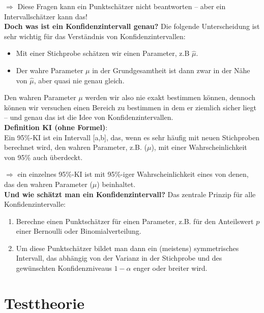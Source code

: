 \documentclass[a4paper]{article}
\begin{document}
\noindent $\Rightarrow$ Diese Fragen kann ein Punktschätzer nicht beantworten – aber ein Intervallschätzer kann das!\\

\noindent \textbf{Doch was ist ein Konfidenzintervall genau?} Die folgende Unterscheidung ist sehr wichtig für das Verständnis von Konfidenzintervallen:

\begin{itemize}
    \item Mit einer Stichprobe schätzen wir einen Parameter, z.B $\hat{\mu}$.
    \item Der wahre Parameter $\mu$ in der Grundgesamtheit ist dann zwar in der Nähe von $\hat{\mu}$, aber quasi nie genau gleich.
\end{itemize}

\noindent Den wahren Parameter $\mu$ werden wir also nie exakt bestimmen können, dennoch können wir versuchen einen Bereich zu bestimmen in dem er ziemlich sicher liegt -- und genau das ist die Idee von Konfidenzintervallen.\\

\noindent \textbf{Definition KI (ohne Formel)}:\\
\noindent Ein 95\%-KI ist ein Intervall [a,b], das, wenn es sehr häufig mit neuen Stichproben berechnet wird, den wahren Parameter, z.B. ($\mu$), mit einer Wahrscheinlichkeit von 95\% auch überdeckt.

\noindent $\Rightarrow$ ein einzelnes 95\%-KI ist mit 95\%-iger Wahrscheinlichkeit eines von denen, das den wahren Parameter ($\mu$) beinhaltet.\\

\noindent \textbf{Und wie schätzt man ein Konfidenzintervall?} Das zentrale Prinzip für alle Konfidenzintervalle:

\begin{enumerate}
    \item Berechne einen Punktschätzer für einen Parameter, z.B. für den Anteilswert $p$ einer Bernoulli oder Binomialverteilung.
    \item Um diese Punktschätzer bildet man dann ein (meistens) symmetrisches Intervall, das abhängig von der Varianz in der Stichprobe und des gewünschten Konfidenzniveaus $1-\alpha$ enger oder breiter wird.
\end{enumerate}




\newpage



\section{Testtheorie}\label{sec:Tests}
\end{document}
